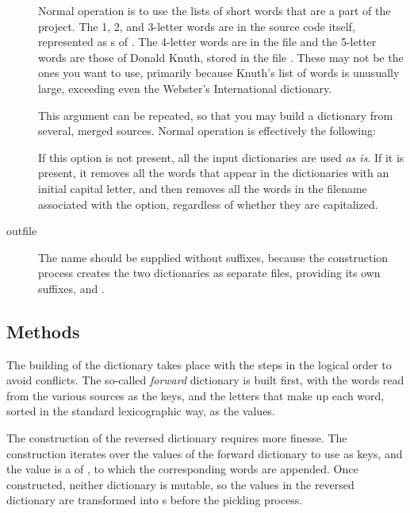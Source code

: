 \documentclass[letterpaper, 11pt]{article}
\begin{document}
\begin{description}
\item[] Normal operation is to use the lists of short words that
are a part of the project. The 1, 2, and 3-letter words are in the source
code itself, represented as s of . The 4-letter
words are in the file  and the 5-letter words 
are those of Donald Knuth, stored in the file .
These may not be the ones you want to use, primarily because Knuth's list of
words is unusually large, exceeding even the Webster's International dictionary.

\item[] This argument can be repeated, so that you may
build a dictionary from several, merged sources. Normal operation is effectively
the following:

\begin{quote}
\small
{}
\end{quote}

\item[] If this option is not present, all the input
dictionaries are used \emph{as is}. If it is present, it removes all the 
words that appear in the dictionaries with an initial capital letter, and
then removes all the words in the filename associated with the option, 
regardless of whether they are capitalized.

\item[outfile] The name should be supplied without suffixes, because the
construction process creates the two dictionaries as separate files,
providing its own suffixes,  and .

\end{description}

\subsection{Methods}

The building of the dictionary takes place with the steps in the
logical order to avoid conflicts. The so-called \emph{forward} dictionary
is built first, with the words read from the various sources as the
keys, and the letters that make up each word, sorted in the standard
lexicographic way, as the values.

The construction of the reversed dictionary requires more finesse.
The construction iterates over the values of the forward dictionary to
use as keys, and the value is a  of , to which the 
corresponding words are appended. Once constructed, neither dictionary
is mutable, so the values in the reversed dictionary are transformed into
s before the pickling process.
\end{document}
